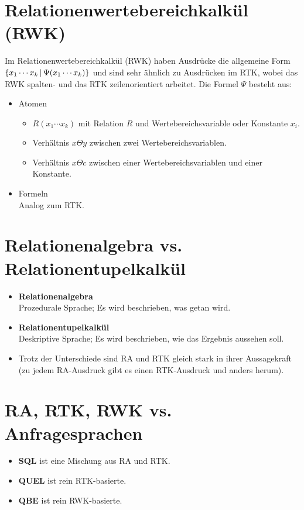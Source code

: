     \section{Relationenwertebereichkalkül (RWK)} %
        Im Relationenwertebereichkalkül (RWK) haben Ausdrücke die allgemeine Form \( \{ x_1 \cdots x_k \,\vert\, \Psi(x_1 \cdots x_k) \} \) und sind sehr ähnlich zu Ausdrücken im RTK, wobei das RWK spalten- und das RTK zeilenorientiert arbeitet. Die Formel \(\Psi\) besteht aus:
        \begin{itemize}
        	\item Atomen
        		\begin{itemize}
        			\item \(R(x_1 \cdots x_k)\) mit Relation \(R\) und Wertebereichsvariable oder Konstante \(x_i\).
        			\item Verhältnis \( x \Theta y \) zwischen zwei Wertebereichsvariablen.
        			\item Verhältnis \( x \Theta c \) zwischen einer Wertebereichsvariablen und einer Konstante.
        		\end{itemize}
        	\item Formeln \\ Analog zum RTK.
        \end{itemize}

    \section{Relationenalgebra vs. Relationentupelkalkül} %
        \begin{itemize}
        	\item \textbf{Relationenalgebra} \\ Prozedurale Sprache; Es wird beschrieben, was getan wird.
        	\item \textbf{Relationentupelkalkül} \\ Deskriptive Sprache; Es wird beschrieben, wie das Ergebnis aussehen soll.
        	\item Trotz der Unterschiede sind RA und RTK gleich stark in ihrer Aussagekraft (zu jedem RA-Ausdruck gibt es einen RTK-Ausdruck und anders herum).
        \end{itemize}

    \section{RA, RTK, RWK vs. Anfragesprachen} %
    	\begin{itemize}
    		\item \textbf{SQL} ist eine Mischung aus RA und RTK.
    		\item \textbf{QUEL} ist rein RTK-basierte.
    		\item \textbf{QBE} ist rein RWK-basierte.
    	\end{itemize}

